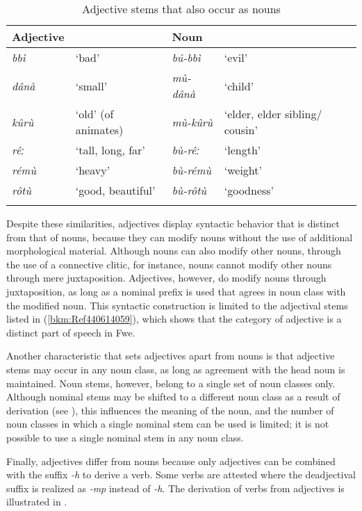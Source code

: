 \begin{table}
\label{bkm:Ref491078565}\caption{\label{tab:4:17}Adjective stems that also occur as nouns}
\begin{tabular}{llll}
\lsptoprule
Adjective &  & Noun & \\
\midrule
{\itshape bbì} & ‘bad’ & {\itshape bú-bbì} & ‘evil’\\
{\itshape dânà} & ‘small’ & {\itshape mù-dânà} & ‘child’\\
{\itshape kûrù} & ‘old’ (of animates) & {\itshape mù-kûrù} & ‘elder, elder sibling/ cousin’\\
{\itshape rêː} & ‘tall, long, far’ & {\itshape bù-rêː} & ‘length’\\
{\itshape rémù} & ‘heavy’ & {\itshape bù-rémù} & ‘weight’\\
{\itshape rôtù} & ‘good, beautiful’ & {\itshape bù-rôtù} & ‘goodness’\\
\lspbottomrule
\end{tabular}
\end{table}

Despite these similarities, adjectives display syntactic behavior that is distinct from that of nouns, because they can modify nouns without the use of additional morphological material. Al\-though nouns can also modify other nouns, through the use of a connective clitic, for instance, nouns cannot modify other nouns through mere juxtaposition. Adjectives, however, do modify nouns through juxtaposition, as long as a nominal prefix is used that agrees in noun class with the modified noun. This syntactic construction is limited to the adjectival stems listed in (\ref{bkm:Ref440614059}), which shows that the category of adjective is a distinct part of speech in Fwe.

Another characteristic that sets adjectives apart from nouns is that adjective stems may occur in any noun class, as long as agreement with the head noun is maintained. Noun stems, however, belong to a single set of noun classes only. Although nominal stems may be shifted to a different noun class as a result of derivation (see ), this influences the meaning of the noun, and the number of noun classes in which a single nominal stem can be used is limited; it is not possible to use a single nominal stem in any noun class.

Finally, adjectives differ from nouns because only adjectives can be combined with the suffix \textit{-h} to derive a verb. Some verbs are attested where the deadjectival suffix is realized as \textit{-mp} instead of \textit{-h}. The derivation of verbs from adjectives is illustrated in .

